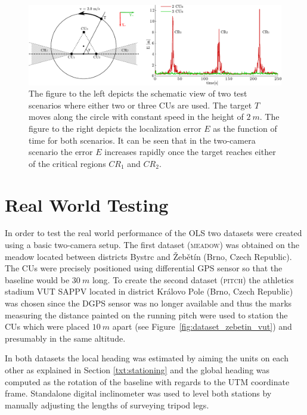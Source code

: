 \begin{figure}[htb]\centering
	\centering
	\includegraphics[width=0.95\linewidth]{fig/schema_two_vs_three_units_and_plot.pdf}
	\caption{The figure to the left depicts the schematic view of two test scenarios where either two or three CUs are used. The target $T$ moves along the circle with constant speed in the height of $2~m$. The figure to the right depicts the localization error $E$ as the function of time for both scenarios. It can be seen that in the two-camera scenario the error $E$ increases rapidly once the target reaches either of the critical regions $CR_{1}$ and $CR_{2}$.}
	\label{fig:test_two_vs_three_cus}
\end{figure}
	
\section{Real World Testing} \label{txt:real_world_testing}

In order to test the real world performance of the OLS two datasets were created using a basic two-camera setup. The first dataset (\textsc{meadow}) was obtained on the meadow located between districts Bystrc and Žebětín (Brno, Czech Republic). The CUs were precisely positioned using differential GPS sensor so that the baseline would be $30~m$ long. To create the second dataset (\textsc{pitch}) the athletics stadium VUT SAPPV located in district Královo Pole (Brno, Czech Republic) was chosen since the DGPS sensor was no longer available and thus the marks measuring the distance painted on the running pitch were used to station the CUs which were placed $10~m$ apart (see Figure~\ref{fig:dataset_zebetin_vut}) and presumably in the same altitude.

In both datasets the local heading was estimated by aiming the units on each other as explained in Section \ref{txt:stationing} and the global heading was computed as the rotation of the baseline with regards to the UTM coordinate frame. Standalone digital inclinometer was used to level both stations by manually adjusting the lengths of surveying tripod legs.

